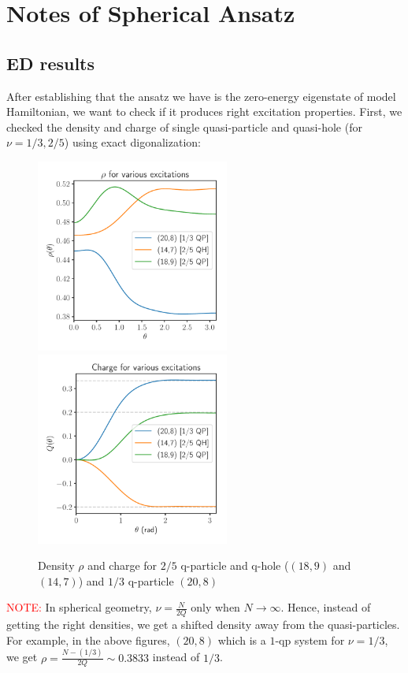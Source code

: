 \documentclass[11pt,a4paper,notitlepage]{article}
\newcommand{\txtre}[1]{\textcolor{Red}{#1}}
\begin{document}
\section{Notes of Spherical Ansatz}
\subsection{ED results}
	After establishing that the ansatz we have is the zero-energy eigenstate of model Hamiltonian, we want to check if it produces right excitation properties. First, we checked the density and charge of single quasi-particle and quasi-hole (for $\nu=1/3,2/5$) using exact digonalization: 

	\begin{figure}[h]
		\centering
		\includegraphics[width=2.5in]{figures/densities_ED.pdf}
		\includegraphics[width=2.5in]{figures/charge_ED.pdf}
		\caption{Density $\rho$ and charge for $2/5$ q-particle and q-hole ($(18,9)$ and $(14,7)$) and $1/3$ q-particle $(20,8)$}
	\end{figure}

	\txtre{NOTE:} In spherical geometry, $\nu=\frac{N}{2Q}$ only when $N\rightarrow \infty$. Hence, instead of getting the right densities, we get a shifted density away from the quasi-particles. For example, in the above figures, $(20,8)$ which is a $1$-qp  system for $\nu=1/3$, we get $\rho=\frac{N-(1/3)}{2Q}\sim 0.3833$ instead of $1/3$.
	
\end{document}
